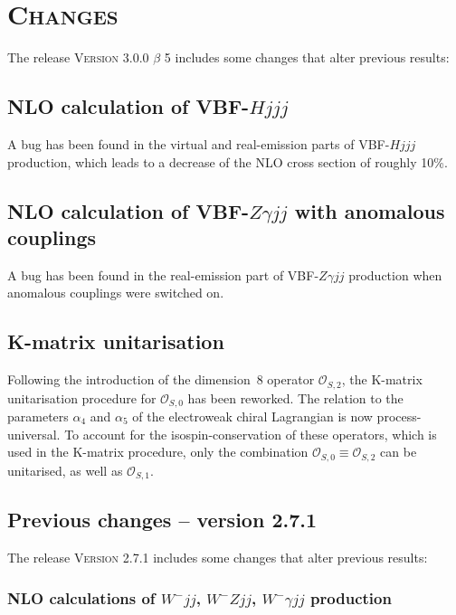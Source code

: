 \documentclass[english,12pt]{article}
\begin{document}
\newpage

\section{\textsc{Changes}}

The release \textsc{Version 3.0.0 $\beta$ 5} includes some changes that alter previous results:

\subsection{NLO calculation of VBF-$Hjjj$}

A bug has been found in the virtual and real-emission parts of VBF-$Hjjj$
production, which leads to a decrease of the NLO cross section of roughly 10\%.

\subsection{NLO calculation of VBF-$Z\gamma jj$ with anomalous couplings}

A bug has been found in the real-emission part of VBF-$Z\gamma jj$
production when anomalous couplings were switched on.

\subsection{K-matrix unitarisation}

Following the introduction of the dimension~8 operator $\mathcal{O}_{S,2}$, the
K-matrix unitarisation procedure for $\mathcal{O}_{S,0}$ has been reworked.
The relation to the parameters $\alpha_4$ and $\alpha_5$ of the electroweak
chiral Lagrangian is now process-universal. To account for the
isospin-conservation of these operators, which is used in the K-matrix
procedure, only the combination $\mathcal{O}_{S,0}\equiv\mathcal{O}_{S,2}$ can
be unitarised, as well as $\mathcal{O}_{S,1}$.


\subsection{Previous changes -- version 2.7.1}

The release \textsc{Version 2.7.1} includes some changes that alter previous results:


\subsubsection{NLO calculations of $W^-jj$, $W^-Zjj$, $W^-\gamma jj$ production}
\end{document}
